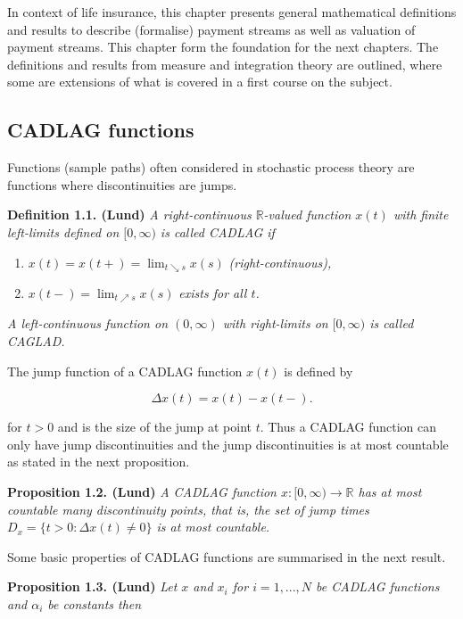 \documentclass[a4paper,12pt,openany]{book}
\providecommand{\tightlist}{%
 \setlength{\itemsep}{0pt}\setlength{\parskip}{0pt}}
\begin{document}
In context of life insurance, this chapter presents general mathematical definitions and results to describe (formalise) payment streams as well as valuation of payment streams. This chapter form the foundation for the next chapters. The definitions and results from measure and integration theory are outlined, where some are extensions of what is covered in a first course on the subject.

\hypertarget{cadlag-functions}{%
\subsection{CADLAG functions}\label{cadlag-functions}}

Functions (sample paths) often considered in stochastic process theory are functions where discontinuities are jumps.

\textbf{Definition 1.1. (Lund)} \emph{A right-continuous \(\mathbb R\)-valued function \(x(t)\) with finite left-limits defined on \([0,\infty)\) is called CADLAG if}

\begin{enumerate}
\def\labelenumi{\roman{enumi})}
\tightlist
\item
  \(x(t)=x(t+)=\lim_{t\searrow s}x(s)\) \emph{(right-continuous),}
\item
  \(x(t-)=\lim_{t\nearrow s}x(s)\) \emph{exists for all \(t\).}
\end{enumerate}

\emph{A left-continuous function on \((0,\infty)\) with right-limits on \([0, \infty)\) is called CAGLAD.}

The jump function of a CADLAG function \(x(t)\) is defined by

\[
\Delta x(t)=x(t)-x(t-).
\]

for \(t>0\) and is the size of the jump at point \(t\). Thus a CADLAG function can only have jump discontinuities and the jump discontinuities is at most countable as stated in the next proposition.

\textbf{Proposition 1.2. (Lund)} \emph{A CADLAG function \(x : [0, \infty) \to \mathbb R\) has at most countable many discontinuity points, that is, the set of jump times \(D_x = \{t > 0 : \Delta x(t)\ne 0\}\) is at most countable.}

Some basic properties of CADLAG functions are summarised in the next result.

\textbf{Proposition 1.3. (Lund)} \emph{Let \(x\) and \(x_i\) for \(i=1,...,N\) be CADLAG functions and \(\alpha_i\) be constants then}
\end{document}
